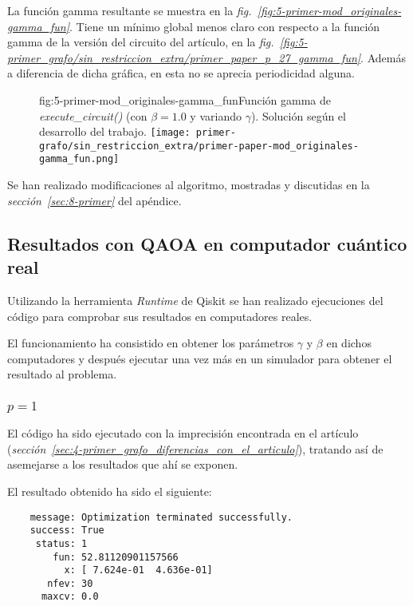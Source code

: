 La función gamma resultante se muestra en la \textit{fig.~\ref{fig:5-primer-mod_originales-gamma_fun}}.
Tiene un mínimo global menos claro con respecto a la función gamma de la versión del circuito del artículo, en la \textit{fig.~\ref{fig:5-primer_grafo/sin_restriccion_extra/primer_paper_p_27_gamma_fun}}.
Además a diferencia de dicha gráfica, en esta no se aprecia periodicidad alguna.

\begin{figure}[Resultados QAOA {--} artículo de Urgelles \textit{et al.} (2022) {--} función gamma de la implementación de QAOA]{fig:5-primer-mod_originales-gamma_fun}{Función gamma de \textit{execute\_circuit()} (con $\beta = 1.0$ y variando $\gamma$). Solución según el desarrollo del trabajo.}
  \centering
  \texttt{[image: primer-grafo/sin\_restriccion\_extra/primer-paper-mod\_originales-gamma\_fun.png]}
\end{figure}

Se han realizado modificaciones al algoritmo, mostradas y discutidas en la \textit{sección~\ref{sec:8-primer}} del apéndice.

\subsection{Resultados con QAOA en computador cuántico real}
Utilizando la herramienta \textit{Runtime} de Qiskit se han realizado ejecuciones del código para comprobar sus resultados en computadores reales.

El funcionamiento ha consistido en obtener los parámetros $\gamma$ y $\beta$ en dichos computadores y después ejecutar una vez más en un simulador para obtener el resultado al problema.

\subsubsection{\(p = 1\)}
El código ha sido ejecutado con la imprecisión encontrada en el artículo\cite{multi-objective_routing_optimization} (\textit{sección~\ref{sec:4-primer_grafo_diferencias_con_el_articulo}}), tratando así de asemejarse a los resultados que ahí se exponen.

El resultado obtenido ha sido el siguiente:

\begin{verbatim}
    message: Optimization terminated successfully.
    success: True
     status: 1
        fun: 52.81120901157566
          x: [ 7.624e-01  4.636e-01]
       nfev: 30
      maxcv: 0.0
\end{verbatim}

